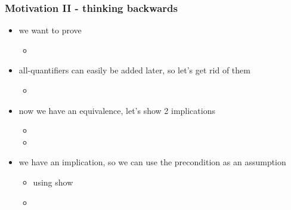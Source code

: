 \begin{frame}
\frametitle{Motivation II - thinking backwards}
\begin{itemize}
\item we want to prove \begin{itemize}
  \item {}
  \end{itemize}
\item all-quantifiers can easily be added later, so let's get rid of them \\
      \begin{itemize}
      \item {}
      \end{itemize}
\item now we have an equivalence, let's show 2 implications \\
      \begin{itemize}
      \item {}
      \item {}
      \end{itemize}
\item we have an implication, so we can use the precondition as an assumption \\
      \begin{itemize}
      \item using  show 
      \item {}
      \end{itemize}
\end{itemize}
\end{frame}

